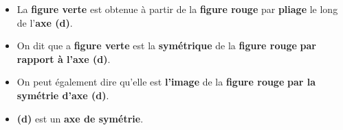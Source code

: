 \begin{myvocabulaire}
    \begin{itemize}
        \item La \textbf{figure verte} est obtenue à partir de la \textbf{figure rouge} par \textbf{pliage} le long de l'\textbf{axe (d)}.
        \item On dit que a \textbf{figure verte} est la \textbf{symétrique} de la \textbf{figure rouge} \textbf{par rapport à l'\textbf{axe (d)}}.
        \item On peut également dire qu'elle est \textbf{l'image} de la \textbf{figure rouge} \textbf{par la symétrie d'axe (d)}.
        \item \textbf{(d)} est un \textbf{axe de symétrie}.
        \end{itemize}
\end{myvocabulaire}
